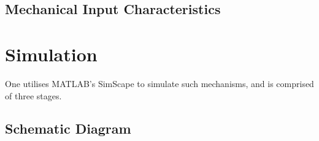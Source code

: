 \documentclass[conference]{ieeetran}
\begin{document}
\subsection{Mechanical Input Characteristics}

\medskip



\section{Simulation}
One utilises MATLAB's SimScape to simulate such mechanisms, and is comprised of three stages.

\subsection{Schematic Diagram}
\end{document}
